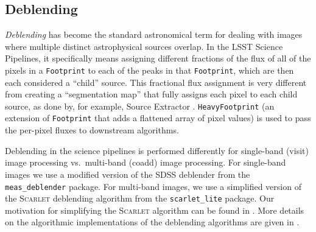 \subsection{Deblending}

\label{sec:deblending}

\emph{Deblending} has become the standard astronomical term for dealing with images where multiple distinct astrophysical sources overlap.
In the LSST Science Pipelines, it specifically means assigning different fractions of the flux of all of the pixels in a \texttt{Footprint} to each of the peaks in that \texttt{Footprint}, which are then each considered a ``child'' source.
This fractional flux assignment is very different from creating a ``segmentation map'' that fully assigns each pixel to each child source, as done by, for example, Source Extractor \citep{1996A&AS..117..393B}.
\texttt{HeavyFootprint} (an extension of \texttt{Footprint} that adds a flattened array of pixel values) is used to pass the per-pixel fluxes to downstream algorithms.

Deblending in the science pipelines is performed differently for single-band (visit) image processing vs.\ multi-band (coadd) image processing.
For single-band images we use a modified version of the SDSS deblender \citep{rhldeblend} from the \texttt{meas\_deblender} package.
For multi-band images, we use a simplified version of the \textsc{Scarlet} deblending algorithm \citep{2018A&C....24..129M} from the \texttt{scarlet\_lite} package.
Our motivation for simplifying the \textsc{Scarlet} algorithm can be found in \citet{DMTN-194}.
More details on the algorithmic implementations of the deblending algorithms are given in .
